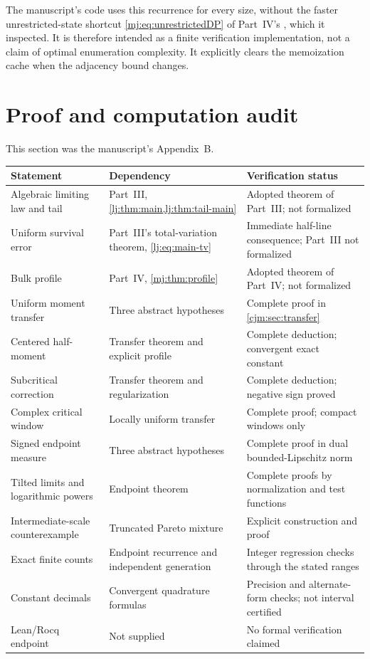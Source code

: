 \documentclass[11pt,a4paper]{article}
\theoremstyle{definition}\newaliascnt{definition}{theorem}
\theoremstyle{remark}\newaliascnt{remark}{theorem}
\begin{document}
The manuscript's code uses this recurrence for every size, without the
faster unrestricted-state shortcut \eqref{mj:eq:unrestrictedDP} of
Part~IV's , which it inspected.
It is therefore intended as a finite verification implementation, not a
claim of optimal enumeration complexity. It explicitly clears the
memoization cache when the adjacency bound changes.

\section{Proof and computation audit}
\label{cjm:app:audit}
This section was the manuscript's Appendix~B.
\begin{longtable}{>{\raggedright}p{.29\linewidth}>{\raggedright}p{.30\linewidth}>{\raggedright\arraybackslash}p{.31\linewidth}}
\toprule
Statement & Dependency & Verification status\\
\midrule
\endhead
Algebraic limiting law and tail & Part~III, \cref{lj:thm:main,lj:thm:tail-main} & Adopted theorem of Part~III; not formalized\\
Uniform survival error & Part~III's total-variation theorem, \eqref{lj:eq:main-tv} & Immediate half-line consequence; Part~III not formalized\\
Bulk profile & Part~IV, \cref{mj:thm:profile} & Adopted theorem of Part~IV; not formalized\\
Uniform moment transfer & Three abstract hypotheses & Complete proof in \cref{cjm:sec:transfer}\\
Centered half-moment & Transfer theorem and explicit profile & Complete deduction; convergent exact constant\\
Subcritical correction & Transfer theorem and regularization & Complete deduction; negative sign proved\\
Complex critical window & Locally uniform transfer & Complete proof; compact windows only\\
Signed endpoint measure & Three abstract hypotheses & Complete proof in dual bounded-Lipschitz norm\\
Tilted limits and logarithmic powers & Endpoint theorem & Complete proofs by normalization and test functions\\
Intermediate-scale counterexample & Truncated Pareto mixture & Explicit construction and proof\\
Exact finite counts & Endpoint recurrence and independent generation & Integer regression checks through the stated ranges\\
Constant decimals & Convergent quadrature formulas & Precision and alternate-form checks; not interval certified\\
Lean/Rocq endpoint & Not supplied & No formal verification claimed\\
\bottomrule
\end{longtable}
\end{document}
